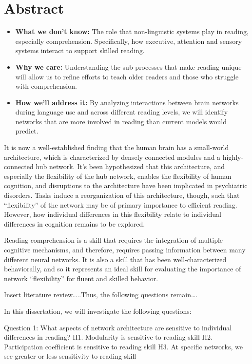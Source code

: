 \chapter{Abstract}

\begin{itemize}
	\item \textbf{What we don't know:} The role that non-linguistic systems play in reading, especially comprehension. Specifically, how executive, attention and sensory systems interact to support skilled reading.
	\item \textbf{Why we care:} Understanding the sub-processes that make reading unique will allow us to refine efforts to teach older readers and those who struggle with comprehension.
	\item \textbf{How we'll address it:} By analyzing interactions between brain networks during language use and across different reading levels, we will identify networks that are more involved in reading than current models would predict. 
\end{itemize}


It is now a well-established finding that the human brain has a small-world architecture, which is characterized by densely connected modules and a highly-connected hub network. It’s been hypothesized that this architecture, and especially the flexibility of the hub network, enables the flexibility of human cognition, and disruptions to the architecture have been implicated in psychiatric disorders. Tasks induce a reorganization of this architecture, though, such that “flexibility” of the network may be of primary importance to efficient reading. However, how individual differences in this flexibility relate to individual differences in cognition remains to be explored.

Reading comprehension is a skill that requires the integration of multiple cognitive mechanisms, and therefore, requires passing information between many different neural networks. It is also a skill that has been well-characterized behaviorally, and so it represents an ideal skill for evaluating the importance of network “flexibility” for fluent and skilled behavior.

Insert literature review…..Thus, the following questions remain….

In this dissertation, we will investigate the following questions:

Question 1: What aspects of network architecture are sensitive to individual differences in reading?
H1. Modularity is sensitive to reading skill
H2. Participation coefficient is sensitive to reading skill
H3. At specific networks, we see greater or less sensitivity to reading skill

